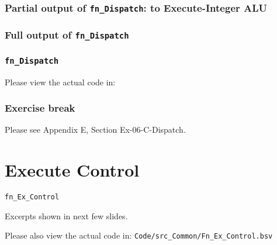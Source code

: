 \begin{frame}[fragile]
\frametitle{Partial output of {\tt fn\_Dispatch}: to Execute-Integer ALU}

\footnotesize


\end{frame}


\begin{frame}[fragile]
\frametitle{Full output of {\tt fn\_Dispatch}}

\footnotesize


\end{frame}


\begin{frame}
\frametitle{{\tt fn\_Dispatch}}

\footnotesize

\begin{center}\large
 Please view the actual code in: 
\end{center}

\end{frame}


\begin{frame}
\frametitle{\EmojiExercise \hmm Exercise break}

Please see Appendix E, Section Ex-06-C-Dispatch.

\end{frame}


\section{Execute Control}

\begin{frame}[fragile]

\begin{center}
  {\LARGE\tt fn\_Ex\_Control}

  \vspace{5ex}

  Excerpts shown in next few slides.

  Please also view the actual code in:
  {\tt Code/src\_Common/Fn\_Ex\_Control.bsv}

\end{center}

\end{frame}


